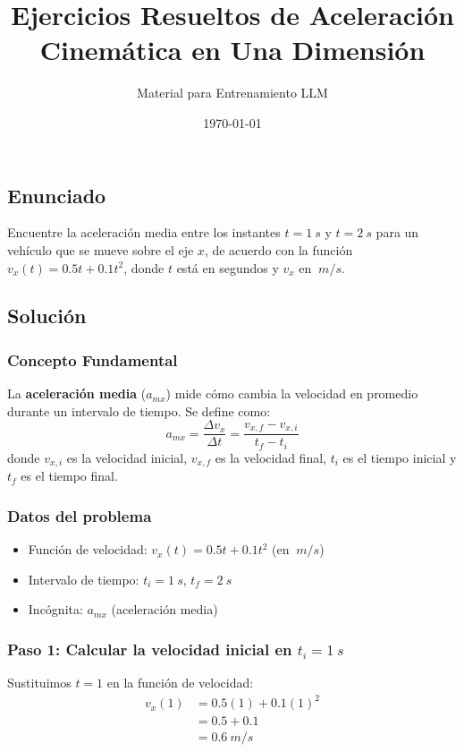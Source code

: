 \documentclass[12pt, a4paper]{article}
\title{Ejercicios Resueltos de Aceleración\\[0.5em]\large Cinemática en Una Dimensión}
\author{Material para Entrenamiento LLM}
\date{\today}
\begin{document}
\maketitle

\tableofcontents
\newpage

\subsection*{Enunciado}
Encuentre la aceleración media entre los instantes $t = \SI{1}{s}$ y $t = \SI{2}{s}$ para un vehículo que se mueve sobre el eje $x$, de acuerdo con la función $v_x(t) = 0.5t + 0.1t^2$, donde $t$ está en segundos y $v_x$ en $\SI{}{m/s}$.

\subsection*{Solución}

\subsubsection*{Concepto Fundamental}
La \textbf{aceleración media} ($a_{mx}$) mide cómo cambia la velocidad en promedio durante un intervalo de tiempo. Se define como:
\begin{equation}
a_{mx} = \frac{\Delta v_x}{\Delta t} = \frac{v_{x,f} - v_{x,i}}{t_f - t_i}
\end{equation}
donde $v_{x,i}$ es la velocidad inicial, $v_{x,f}$ es la velocidad final, $t_i$ es el tiempo inicial y $t_f$ es el tiempo final.

\subsubsection*{Datos del problema}
\begin{itemize}[leftmargin=2cm]
    \item Función de velocidad: $v_x(t) = 0.5t + 0.1t^2$ (en $\SI{}{m/s}$)
    \item Intervalo de tiempo: $t_i = \SI{1}{s}$, $t_f = \SI{2}{s}$
    \item Incógnita: $a_{mx}$ (aceleración media)
\end{itemize}

\subsubsection*{Paso 1: Calcular la velocidad inicial en $t_i = \SI{1}{s}$}
Sustituimos $t = 1$ en la función de velocidad:
\begin{align*}
v_x(1) &= 0.5(1) + 0.1(1)^2 \\
&= 0.5 + 0.1 \\
&= \SI{0.6}{m/s}
\end{align*}
\end{document}
